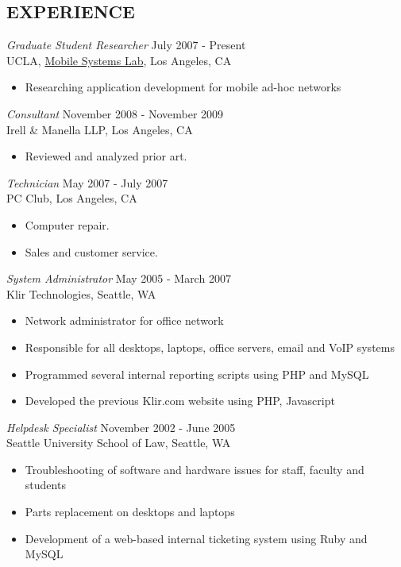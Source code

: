 \documentclass[margin]{res}
\begin{document}
\begin{resume}
\section{EXPERIENCE}

		{\sl Graduate Student Researcher} \hfill July 2007 - Present \\
                UCLA, \href{http://msl.cs.ucla.edu}{Mobile Systems Lab}, Los Angeles, CA
                 \begin{itemize}  \itemsep -2pt %
                \item Researching application development for mobile ad-hoc networks
                \end{itemize}

		{\sl Consultant} \hfill November 2008 - November 2009 \\
		Irell \& Manella LLP, Los Angeles, CA
                 \begin{itemize}  \itemsep -2pt %
                \item Reviewed and analyzed prior art.
                \end{itemize}

		{\sl Technician} \hfill May 2007 - July 2007 \\
		PC Club, Los Angeles, CA
                 \begin{itemize}  \itemsep -2pt %
                \item Computer repair.
                \item Sales and customer service.
                \end{itemize}

		{\sl System Administrator} \hfill May 2005 - March 2007 \\
                Klir Technologies, Seattle, WA 
                 \begin{itemize}  \itemsep -2pt %
                \item Network administrator for office network
		\item Responsible for all desktops, laptops, office servers, email and VoIP systems
		\item Programmed several internal reporting scripts using PHP and MySQL
		\item Developed the previous Klir.com website using PHP, Javascript
                \end{itemize}

		{\sl Helpdesk Specialist} \hfill November 2002 - June 2005 \\
                Seattle University School of Law, Seattle, WA 
                 \begin{itemize}  \itemsep -2pt %
                \item Troubleshooting of software and hardware issues for staff, faculty and students
		\item Parts replacement on desktops and laptops
		\item Development of a web-based internal ticketing system using Ruby and MySQL
                \end{itemize}


\end{resume}
\end{document}
